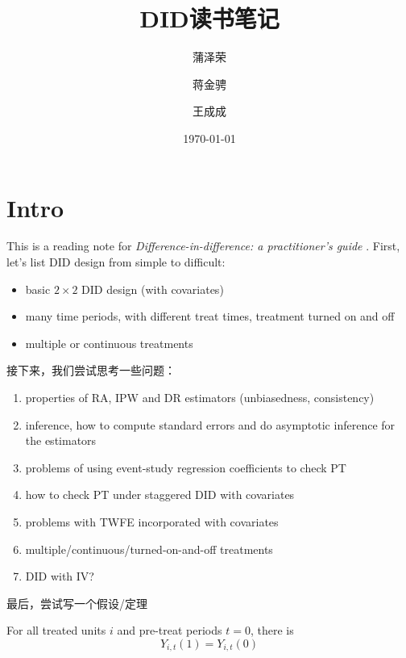 \documentclass[11pt]{article}
\title{DID读书笔记}
\author{蒲泽荣 \and 蒋金骋 \and 王成成}
\date{\today}
\begin{document}
\maketitle

\section{Intro}

This is a reading note for \textit{Difference-in-difference: a
practitioner's guide} \parencite{Baker.etal2025}. First, let's list DID design from simple
to difficult:
\begin{itemize}
  \item basic \( 2 \times 2 \) DID design (with covariates)
  \item many time periods, with different treat times, treatment
    turned on and off
  \item multiple or continuous treatments
\end{itemize}

接下来，我们尝试思考一些问题：
\begin{enumerate}
  \item properties of RA, IPW and DR estimators (unbiasedness, consistency)
  \item inference, how to compute standard errors and do asymptotic inference for the estimators
  \item problems of using event-study regression coefficients to check PT
  \item how to check PT under staggered DID with covariates
  \item problems with TWFE incorporated with covariates
  \item multiple/continuous/turned-on-and-off treatments
  \item DID with IV\@?
\end{enumerate}

最后，尝试写一个假设/定理
\begin{assumption}[No anticipation, NA]
  For all treated units $i$ and pre-treat periods $t=0$, there is
  $$
  Y_{i,t}(1) = Y_{i,t}(0)
  $$
\end{assumption}



\appendix

\printbibliography[title={References}]
\end{document}
